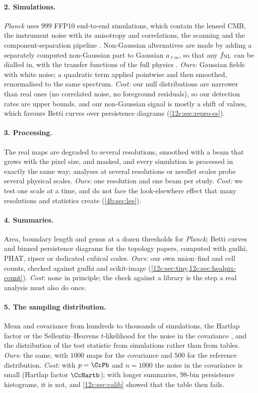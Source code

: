 \paragraph{2. Simulations.} \textit{Planck} uses $999$ FFP10 end-to-end simulations, which contain the lensed CMB, the instrument noise with
its anisotropy and correlations, the scanning and the component-separation pipeline \cite{Planck2018VII}. Non-Gaussian alternatives are made
by adding a separately computed non-Gaussian part to Gaussian $a_{\ell m}$, so that any $f_{\rm NL}$ can be dialled in, with the transfer
functions of the full physics \cite{ColeShiu2018}. \emph{Ours:} Gaussian fields with white noise; a quadratic term applied pointwise and then
smoothed, renormalised to the same spectrum. \emph{Cost:} our null distributions are narrower than real ones (no correlated noise, no
foreground residuals), so our detection rates are upper bounds, and our non-Gaussian signal is mostly a shift of values, which favours
Betti curves over persistence diagrams (\cref{12c:sec:repro-cs}).

\paragraph{3. Processing.} The real maps are degraded to several resolutions, smoothed with a beam that grows with the pixel size, and
masked, and every simulation is processed in exactly the same way; analyses at several resolutions or needlet scales probe several
physical scales. \emph{Ours:} one resolution and one beam per study. \emph{Cost:} we test one scale at a time, and do not face the
look-elsewhere effect that many resolutions and statistics create (\cref{4b:sec:lee}).

\paragraph{4. Summaries.} Area, boundary length and genus at a dozen thresholds for \textit{Planck}; Betti curves and binned persistence
diagrams for the topology papers, computed with gudhi, PHAT, ripser or dedicated cubical codes. \emph{Ours:} our own union--find and cell
counts, checked against gudhi and scikit-image (\cref{12c:sec:tiny,12c:sec:healpix-count}). \emph{Cost:} none in principle; the check
against a library is the step a real analysis must also do once.

\paragraph{5. The sampling distribution.} Mean and covariance from hundreds to thousands of simulations, the Hartlap factor or the
Sellentin--Heavens $t$-likelihood for the noise in the covariance \cite{Hartlap2007,SellentinHeavens2016}, and the distribution of the test
statistic from simulations rather than from tables. \emph{Ours:} the same, with $1000$ maps for the covariance and $500$ for the reference
distribution. \emph{Cost:} with $p=\CcPb$ and $n=1000$ the noise in the covariance is small (Hartlap factor $\CcHartb$); with longer
summaries, $98$-bin persistence histograms, it is not, and \cref{12c:sec:calib} showed that the table then fails.

